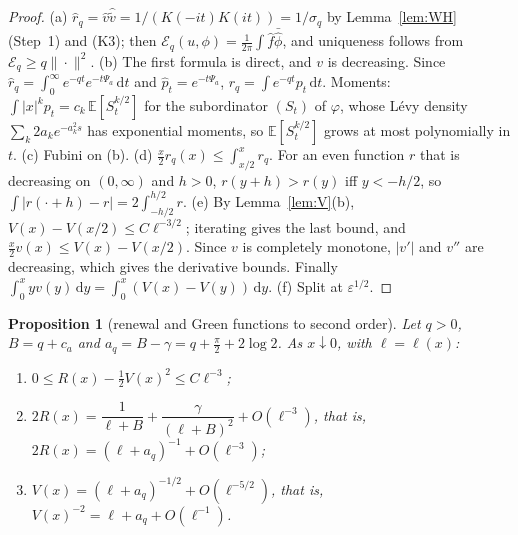 \documentclass[11pt]{amsart}
\newcommand{\cE}{\mathcal{E}}
\newcommand{\dd}{\,\mathrm{d}}
\newcommand{\eps}{\varepsilon}
\newtheorem{proposition}[theorem]{Proposition}
\theoremstyle{definition}
\theoremstyle{remark}
\numberwithin{equation}{section}
\begin{document}
\begin{proof}
(a) $\hat r_q=\hat v\hat{\tilde v}=1/(K(-it)K(it))=1/\sigma_q$ by Lemma~\ref{lem:WH} (Step~1) and (K3); then $\cE_q(u,\phi)=\frac1{2\pi}\int\hat f\bar{\hat\phi}$, and uniqueness follows from $\cE_q\ge q\|\cdot\|^2$. (b) The first formula is direct, and $v$ is decreasing. Since $\hat r_q=\int_0^\infty e^{-qt}e^{-t\Psi_a}\dd t$ and $\hat p_t=e^{-t\Psi_a}$, $r_q=\int e^{-qt}p_t\dd t$. Moments: $\int|x|^kp_t=c_k\,\mathbb E[S_t^{k/2}]$ for the subordinator $(S_t)$ of $\varphi$, whose L\'evy density $\sum_k2a_ke^{-a_k^2s}$ has exponential moments, so $\mathbb E[S_t^{k/2}]$ grows at most polynomially in $t$. (c) Fubini on (b). (d) $\frac x2r_q(x)\le\int_{x/2}^xr_q$. For an even function $r$ that is decreasing on $(0,\infty)$ and $h>0$, $r(y+h)>r(y)$ iff $y<-h/2$, so $\int|r(\cdot+h)-r|=2\int_{-h/2}^{h/2}r$. (e) By Lemma~\ref{lem:V}(b), $V(x)-V(x/2)\le C\ell^{-3/2}$; iterating gives the last bound, and $\frac x2v(x)\le V(x)-V(x/2)$. Since $v$ is completely monotone, $|v'|$ and $v''$ are decreasing, which gives the derivative bounds. Finally $\int_0^xyv(y)\dd y=\int_0^x(V(x)-V(y))\dd y$. (f) Split at $\eps^{1/2}$.
\end{proof}

\begin{proposition}[renewal and Green functions to second order]\label{prop:R}
Let $q>0$, $B=q+c_a$ and $a_q=B-\gamma=q+\frac\pi2+2\log2$. As $x\downarrow0$, with $\ell=\ell(x)$:
\begin{enumerate}
\item[(R1)] $0\le R(x)-\frac12V(x)^2\le C\ell^{-3}$;
\item[(R2)] $2R(x)=\dfrac1{\ell+B}+\dfrac\gamma{(\ell+B)^2}+O(\ell^{-3})$, that is, $2R(x)=(\ell+a_q)^{-1}+O(\ell^{-3})$;
\item[(V2)] $V(x)=(\ell+a_q)^{-1/2}+O(\ell^{-5/2})$, that is, $V(x)^{-2}=\ell+a_q+O(\ell^{-1})$.
\end{enumerate}
\end{proposition}
\end{document}

